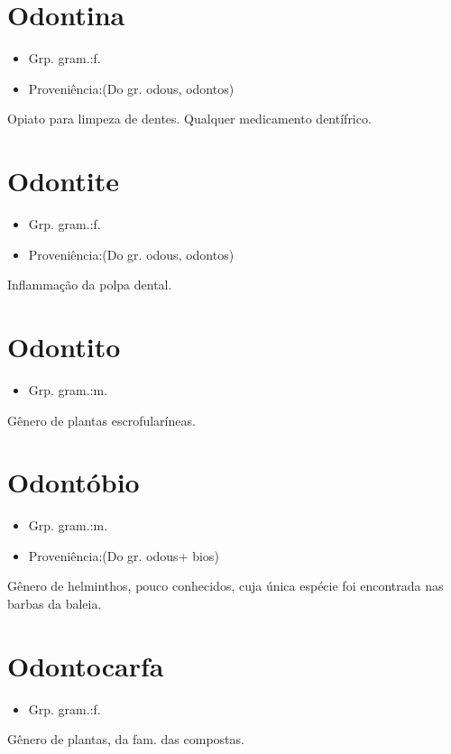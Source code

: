 \section{Odontina}
\begin{itemize}
\item {Grp. gram.:f.}
\end{itemize}
\begin{itemize}
\item {Proveniência:(Do gr. \textunderscore odous\textunderscore , \textunderscore odontos\textunderscore )}
\end{itemize}
Opiato para limpeza de dentes.
Qualquer medicamento dentífrico.
\section{Odontite}
\begin{itemize}
\item {Grp. gram.:f.}
\end{itemize}
\begin{itemize}
\item {Proveniência:(Do gr. \textunderscore odous\textunderscore , \textunderscore odontos\textunderscore )}
\end{itemize}
Inflammação da polpa dental.
\section{Odontito}
\begin{itemize}
\item {Grp. gram.:m.}
\end{itemize}
Gênero de plantas escrofularíneas.
\section{Odontóbio}
\begin{itemize}
\item {Grp. gram.:m.}
\end{itemize}
\begin{itemize}
\item {Proveniência:(Do gr. \textunderscore odous\textunderscore  + \textunderscore bios\textunderscore )}
\end{itemize}
Gênero de helminthos, pouco conhecidos, cuja única espécie foi encontrada nas barbas da baleia.
\section{Odontocarfa}
\begin{itemize}
\item {Grp. gram.:f.}
\end{itemize}
Gênero de plantas, da fam. das compostas.
